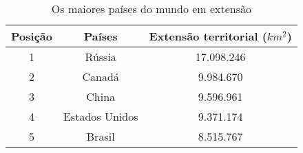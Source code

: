 \documentclass[12pt, a4paper]{article}
\begin{document}
\begin{table}[h]
\centering
\caption{Os maiores países do mundo em extensão}
\vspace{0.5cm}
\begin{tabular}{ c | cc |}
	Posição & Países & Extensão territorial ($km^{2}$) \\ \hline
	1 & Rússia 			& 17.098.246 \\
	2 & Canadá 			& 9.984.670 \\
	3 & China 			& 9.596.961 \\
	4 & Estados Unidos 	& 9.371.174 \\
	5 & Brasil 			& 8.515.767 \\

\end{tabular}

\end{table}
\end{document}
